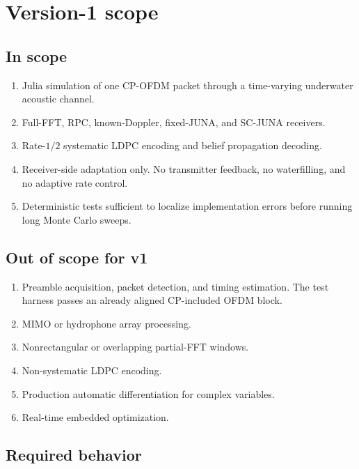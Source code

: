 \documentclass[11pt]{article}
\begin{document}
\section{Version-1 scope}

\subsection{In scope}

\begin{enumerate}
\item Julia simulation of one CP-OFDM packet through a time-varying underwater acoustic channel.
\item Full-FFT, RPC, known-Doppler, fixed-JUNA, and SC-JUNA receivers.
\item Rate-$1/2$ systematic LDPC encoding and belief propagation decoding.
\item Receiver-side adaptation only. No transmitter feedback, no waterfilling, and no adaptive rate control.
\item Deterministic tests sufficient to localize implementation errors before running long Monte Carlo sweeps.
\end{enumerate}

\subsection{Out of scope for v1}

\begin{enumerate}
\item Preamble acquisition, packet detection, and timing estimation. The test harness passes an already aligned CP-included OFDM block.
\item MIMO or hydrophone array processing.
\item Nonrectangular or overlapping partial-FFT windows.
\item Non-systematic LDPC encoding.
\item Production automatic differentiation for complex variables.
\item Real-time embedded optimization.
\end{enumerate}

\subsection{Required behavior}
\end{document}
